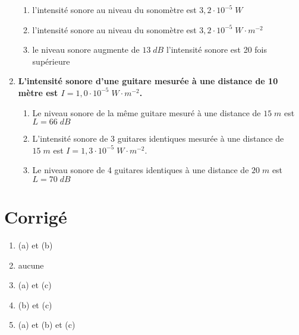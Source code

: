 \documentclass[11pt,a4paper]{article}
\newcommand{\es}[1]{\cdot10^{#1}}
\begin{document}
\begin{enumerate}
    \begin{enumerate}
        \item 	l’intensité sonore au niveau du sonomètre est $3,2\es{-5}\; W$
        \item l’intensité sonore au niveau du sonomètre est $3,2\es{-5}\; W\cdot m^{-2}$
        \item le niveau sonore augmente de $13\; dB$ l’intensité sonore est 20 fois supérieure
    \end{enumerate}
    \item \textbf{L’intensité sonore d’une guitare mesurée à une distance de 10 mètre est $I=1,0\es{-5}\; W\cdot m^{-2}$. }
    \begin{enumerate}
        \item Le niveau sonore de la même guitare mesuré à une distance de $15\; m$ est $L=66\; dB$
        \item L’intensité sonore de 3 guitares identiques mesurée à une distance de $15\; m$ est $I=1,3\es{-5}\; W\cdot m^{-2}$. 
        \item Le niveau sonore de 4 guitares identiques à une distance de $20\; m$ est $L=70\; dB$

    \end{enumerate}
\end{enumerate}    
    
\section*{Corrigé}

\begin{multicols}{2}
\begin{enumerate}
    \item (a) et (b) 
    \item aucune
    \item (a) et (c)
    \item (b) et (c)
    \item (a) et (b) et (c)
\end{enumerate}
\end{multicols}
\end{document}
